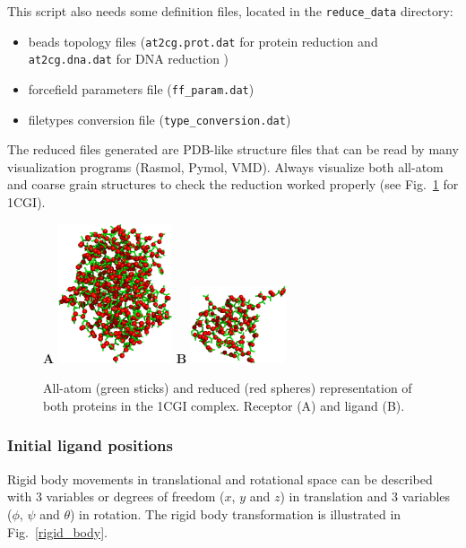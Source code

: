 \documentclass[12pt,a4paper]{article}
\begin{document}
This script also needs some definition files, located in the \verb=reduce_data= directory:

\begin{itemize}
\item beads topology files ({\tt at2cg.prot.dat} for protein reduction and {\tt at2cg.dna.dat} for DNA reduction )
\item forcefield parameters file ({\tt ff\_param.dat})
\item filetypes conversion file ({\tt type\_conversion.dat})
\end{itemize}

The reduced files generated are PDB-like structure files that can be read by many visualization programs (Rasmol, Pymol, VMD). Always visualize both all-atom and coarse grain structures to check the reduction worked properly (see Fig.~\ref{1CGI_at_cg} for 1CGI).

\begin{figure}[htbp]
\center
{\textbf A}
\includegraphics*[width=0.30\textwidth]{img/1CGI_receptor.png}
\hspace*{2cm}
{\textbf B}
\includegraphics*[width=0.25\textwidth]{img/1CGI_ligand.png}
\caption{All-atom (green sticks) and reduced (red spheres) representation of 
both proteins in the 1CGI complex. Receptor (A) and ligand (B).}
\label{1CGI_at_cg}
\end{figure}

\subsubsection{Initial ligand positions}

Rigid body movements in translational and rotational space can be described
with 3 variables or degrees of freedom ($x$, $y$ and $z$) in translation 
and 3 variables ($\phi$, $\psi$ and $\theta$) in rotation. The rigid body 
transformation is illustrated in Fig.~\ref{rigid_body}.
\end{document}
